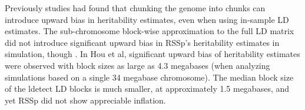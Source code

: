 Previously studies had found that chunking the genome into chunks can introduce upward bias in heritability estimates, even when using in-sample LD estimates\cite{Hou_2019}.  The sub-chromosome block-wise approximation to the full
LD matrix did not introduce significant upward bias in RSSp's heritability estimates in simulation, though .   In Hou et al, significant upward bias of heritability estimates were observed with block sizes as large as 4.3 megabases (when analyzing simulations based on a single 34 megabase chromosome).  The median block size of the ldetect LD blocks is much smaller, at approximately 1.5 megabases, and yet RSSp did not show appreciable inflation.





